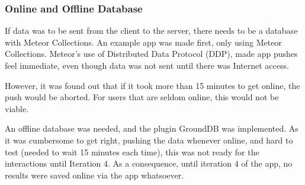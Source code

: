 
\subsubsection{Online and Offline Database}
If data was to be sent from the client to the server, there needs to be a database with Meteor Collections. An example app was made first, only using Meteor Collections. Meteor's use of Distributed Data Protocol (DDP), made app pushes feel immediate, even though data was not sent until there was Internet access.

However, it was found out that if it took more than 15 minutes to get online, the push would be aborted. For users that are seldom online, this would not be viable.

An offline database was needed, and the plugin GroundDB was implemented. As it was cumbersome to get right, pushing the data whenever online, and hard to test (needed to wait 15 minutes each time), this was not ready for the interactions until Iteration 4. As a consequence, until iteration 4 of the app, no results were saved online via the app whatsoever.

